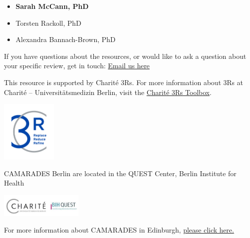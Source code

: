 \documentclass[
]{book}
\providecommand{\tightlist}{%
  \setlength{\itemsep}{0pt}\setlength{\parskip}{0pt}}
\begin{document}
\begin{itemize}
\tightlist
\item
  \textbf{Sarah McCann, PhD}
\item
  Torsten Rackoll, PhD
\item
  Alexandra Bannach-Brown, PhD
\end{itemize}

If you have questions about the resources, or would like to ask a question about your specific review, get in touch: \href{mailto:CAMARADES.berlin@charite.de}{Email us here}

This resource is supported by Charité 3Rs. For more information about 3Rs at Charité -- Universitätsmedizin Berlin, visit the \href{https://charite3r.charite.de/en/charite_3r_toolbox/}{Charité 3Rs Toolbox}.

\includegraphics[width=0.2\textwidth,height=\textheight]{figs/C3R_Screen_Farbe.jpg}

CAMARADES Berlin are located in the QUEST Center, Berlin Institute for Health

\includegraphics[width=0.3\textwidth,height=\textheight]{charite-BIHquest.jpg}

For more information about CAMARADES in Edinburgh, \href{https://www.ed.ac.uk/clinical-brain-sciences/research/camarades}{please click here.}

  
\end{document}
